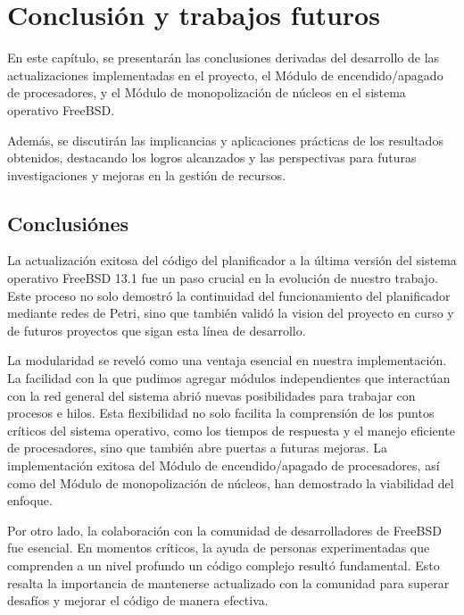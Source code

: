 \section{Conclusión y trabajos futuros}

En este capítulo, se presentarán las conclusiones derivadas del desarrollo de las actualizaciones implementadas en el proyecto, el Módulo de encendido/apagado de procesadores, y el Módulo de monopolización de núcleos en el sistema operativo FreeBSD.\par

Además, se discutirán las implicancias y aplicaciones prácticas de los resultados obtenidos, destacando los logros alcanzados y las perspectivas para futuras investigaciones y mejoras en la gestión de recursos.\par

\subsection{Conclusiónes}
La actualización exitosa del código del planificador a la última versión del sistema operativo FreeBSD 13.1 fue un paso crucial en la evolución de nuestro trabajo.  Este proceso no solo demostró la continuidad del funcionamiento del planificador mediante redes de Petri, sino que también validó la vision del proyecto en curso y de futuros proyectos que sigan esta línea de desarrollo.\par

La modularidad se reveló como una ventaja esencial en nuestra implementación. La facilidad con la que pudimos agregar módulos independientes que interactúan con la red general del sistema abrió nuevas posibilidades para trabajar con procesos e hilos. Esta flexibilidad no solo facilita la comprensión de los puntos críticos del sistema operativo, como los tiempos de respuesta y el manejo eficiente de procesadores, sino que también abre puertas a futuras mejoras. La implementación exitosa del Módulo de encendido/apagado de procesadores, así como del Módulo de monopolización de núcleos, han demostrado la viabilidad del enfoque.\par

Por otro lado, la colaboración con la comunidad de desarrolladores de FreeBSD fue esencial. En momentos críticos, la ayuda de personas experimentadas que comprenden a un nivel profundo un código complejo resultó fundamental. Esto resalta la importancia de mantenerse actualizado con la comunidad para superar desafíos y mejorar el código de manera efectiva.\par

